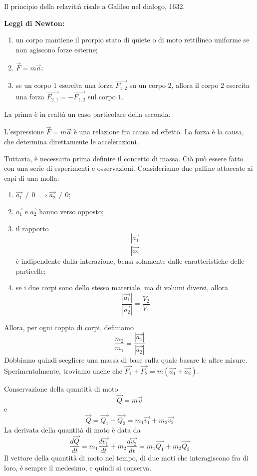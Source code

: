 \documentclass[a4paper]{article}
\begin{document}
Il principio della relavitià risale a Galileo nel dialogo, 1632.

\textbf{Leggi di Newton:}
\begin{enumerate}
    \item un corpo mantiene il prorpio stato di quiete
    o di moto rettilineo uniforme
    se non agiscono forze esterne;
    \item \(\vec{F} = m\vec{a}\);
    \item se un corpo \(1\) esercita una forza \(\vec{F_{1,2}}\) su un corpo \(2\),
    allora il corpo \(2\) esercita una forza \(\vec{F_{2,1}} = -\vec{F_{1,2}}\)
    sul corpo \(1\).
\end{enumerate}

La prima è in realtà un caso particolare della seconda.

L'espressione \(\vec{F} = m\vec{a}\) è una relazione fra causa ed effetto. La forza è la causa,
che determina direttamente le accelerazioni.

Tuttavia, è necessario prima definire il concetto di massa.
Ciò può essere fatto con una serie di esperimenti e osservazioni.
Consideriamo due palline attaccate ai capi di una molla:
\begin{enumerate}
    \item \(\vec{a_1} \neq 0 \implies \vec{a_2} \neq 0\);
    \item \(\vec{a_1}\) e \(\vec{a_2}\) hanno verso opposto;
    \item il rapporto \[
        \frac{|\vec{a_1}|}{|\vec{a_2}|}
    \]
    è indipendente dalla interazione, bensì solamente dalle caratteristiche
    delle particelle;
    \item se i due corpi sono dello stesso materiale, ma di volumi diversi,
    allora
    \[
        \frac{|\vec{a_1}|}{|\vec{a_2}|} = \frac{V_2}{V_1}
    \]
\end{enumerate}
Allora, per ogni coppia di corpi, definiamo
\[
    \frac{m_2}{m_1} = \frac{|\vec{a_1}|}{|\vec{a_2}|}
\]
Dobbiamo quindi scegliere una massa di base sulla quale basare le altre misure.
Sperimentalmente, troviamo anche che \(\vec{F_1} + \vec{F_2} = m(\vec{a_1} + \vec{a_2})\).

Conservazione della quantità di moto
\[
    \vec{Q} = m\vec{v}
\]
e
\[
    \vec{Q} = \vec{Q_1} + \vec{Q_2} = m_1\vec{v_1} +  m_2\vec{v_2}
\]
La derivata della quantità di moto è data da
\[
    \frac{d\vec{Q}}{dt} = m_1 \frac{d\vec{v_1}}{dt} + m_2 \frac{d\vec{v_2}}{dt}
    = m_1 \vec{Q_1} + m_2 \vec{Q_2}
\]
Il vettore della quantità di moto nel tempo, di due moti che interagiscono fra di loro,
è sempre il medesimo, e quindi si conserva.
\end{document}
